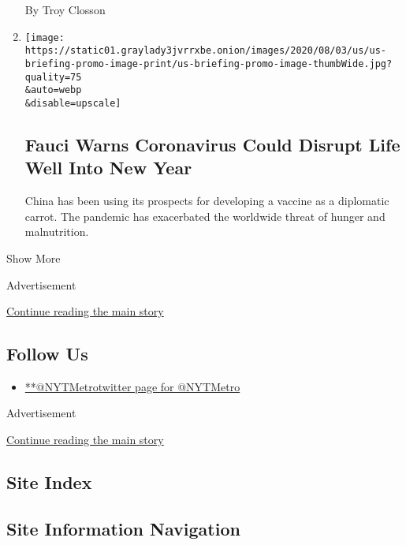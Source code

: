 \begin{enumerate}
  By Troy Closson
\item
  \href{/2020/09/11/world/covid-19-coronavirus.html}{}

  \texttt{[image: https://static01.graylady3jvrrxbe.onion/images/2020/08/03/us/us-briefing-promo-image-print/us-briefing-promo-image-thumbWide.jpg?quality=75\\\&auto=webp\\\&disable=upscale]}

  \hypertarget{fauci-warns-coronavirus-could-disrupt-life-well-into-new-year}{%
  \subsection{Fauci Warns Coronavirus Could Disrupt Life Well Into New
  Year}\label{fauci-warns-coronavirus-could-disrupt-life-well-into-new-year}}

  China has been using its prospects for developing a vaccine as a
  diplomatic carrot. The pandemic has exacerbated the worldwide threat
  of hunger and malnutrition.
\end{enumerate}

Show More

Advertisement

\protect\hyperlink{after-mid2}{Continue reading the main story}

\hypertarget{follow-us}{%
\subsection{Follow Us}\label{follow-us}}

\begin{itemize}
\tightlist
\item
  \href{https://twitter.com/NYTMetro}{**@NYTMetrotwitter page for
  @NYTMetro}
\end{itemize}

Advertisement

\protect\hyperlink{after-mktg}{Continue reading the main story}

\hypertarget{site-index}{%
\subsection{Site Index}\label{site-index}}

\hypertarget{site-information-navigation}{%
\subsection{Site Information
Navigation}\label{site-information-navigation}}

